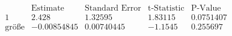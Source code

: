\[\begin{array}{l|llll}
 \text{} & \text{Estimate} & \text{Standard Error} & \text{t-Statistic} & \text{P-Value} \\
\hline
 1 & 2.428 & 1.32595 & 1.83115 & 0.0751407 \\
 \text{gr{\" o}{\ss}e} & -0.00854845 & 0.00740445 & -1.1545 & 0.255697 \\
\end{array}\]

